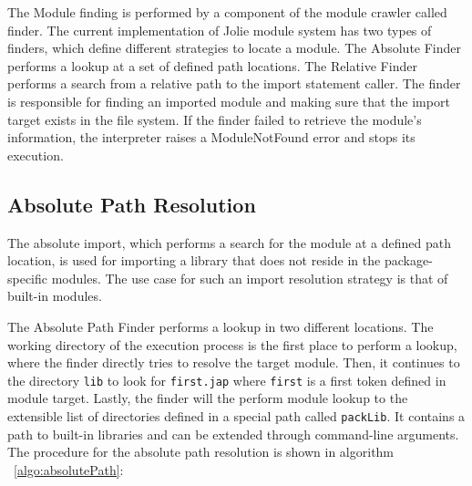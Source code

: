 The Module finding is performed by a component of the module crawler called finder. The current implementation of Jolie module system has two types of finders, which define different strategies to locate a module. The Absolute Finder performs a lookup at a set of defined path locations. The Relative Finder performs a search from a relative path to the import statement caller. The finder is responsible for finding an imported module and making sure that the import target exists in the file system. If the finder failed to retrieve the module's information, the interpreter raises a ModuleNotFound error and stops its execution.

\subsection{ Absolute Path Resolution }

The absolute import, which performs a search for the module at a defined path location, is used for importing a library that does not reside in the package-specific modules. The use case for such an import resolution strategy is that of built-in modules.

The Absolute Path Finder performs a lookup in two different locations. The working directory of the execution process is the first place to perform a lookup, where the finder directly tries to resolve the target module. Then, it continues to the directory \texttt{lib} to look for \texttt{first.jap} where \texttt{first} is a first token defined in module target. Lastly, the finder will the perform module lookup to the extensible list of directories defined in a special path called \texttt{packLib}. It contains a path to built-in libraries and can be extended through command-line arguments. The procedure for the absolute path resolution is shown in algorithm ~\ref{algo:absolutePath}:

